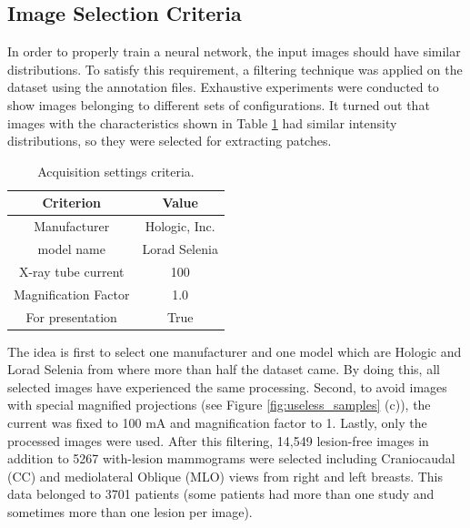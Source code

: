 \documentclass[final,3p,twocolumn,authoryear,sort&compress,times]{maia}
\begin{document}
\subsection{Image Selection Criteria}
\label{sec:image_selection}
In order to properly train a neural network, the input images should have similar distributions. To satisfy this requirement, a filtering technique was applied on the dataset using the annotation files. Exhaustive experiments were conducted to show images belonging to different sets of configurations. It turned out that images with the characteristics shown in Table \ref{tab:image_filtering} had similar intensity distributions, so they were selected for extracting patches.
\begin{table}
    \caption{Acquisition settings criteria.}
    \centering
    \begin{tabular}{|c|c|}
         \hline
        \textbf{Criterion} & \textbf{Value}\\
        \hline
        Manufacturer & Hologic, Inc. \\
        \hline
        model name & Lorad Selenia\\
        \hline
    X-ray tube current & 100\\
    \hline
    Magnification Factor &1.0\\
    \hline
    For presentation & True\\
    \hline
    \end{tabular}

    \label{tab:image_filtering}
\end{table}
 The idea is first to select one manufacturer and one model which are Hologic and Lorad Selenia from where more than half the dataset came. By doing this, all selected images have experienced the same processing. Second, to avoid images with special magnified projections (see Figure \ref{fig:useless_samples} (c)), the current was fixed to 100 mA and magnification factor to 1. Lastly, only the processed images were used. After this filtering, 14,549 lesion-free images in addition to 5267 with-lesion mammograms were selected including Craniocaudal (CC) and mediolateral Oblique (MLO) views from right and left breasts. This data belonged to 3701 patients (some patients had more than one study and sometimes more than one lesion per image).
\end{document}
